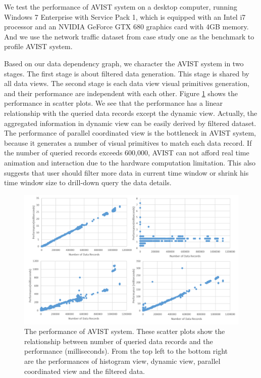 \documentclass[journal]{vgtc}                %
\begin{document}
{We test the performance of AVIST system on a desktop computer, running Windows 7 Enterprise with Service Pack 1, which is equipped with an Intel i7 processor and an NVIDIA GeForce GTX 680 graphics card with 4GB memory. And we use the network traffic dataset from case study one as the benchmark to profile AVIST system.  



Based on our data dependency graph, we character the AVIST system in two stages. The first stage is about filtered data generation. This stage is shared by all data views. The second stage is each data view visual primitives generation, and their performance are independent with each other. Figure \ref{fig:performance} shows the performance in scatter plots. We see that the performance has a linear relationship with the queried data records except the dynamic view. Actually, the aggregated information in dynamic view can be easily derived by filtered dataset. The performance of parallel coordinated view is the bottleneck in AVIST system, because it generates a number of visual primitives to match each data record. If the number of queried records exceeds 600,000, AVIST can not afford real time animation and interaction due to the hardware computation limitation. This also suggests that user should filter more data in current time window or shrink his time window size to drill-down query the data details.

\begin{figure}[htb]
	\centering
	\includegraphics[width=1.0\linewidth]{pic/performance.png}
	\parbox[t]{1.0\columnwidth}{\relax
	}
	\caption{\label{fig:performance}
		The performance of AVIST system. These scatter plots show the relationship between number of queried data records and the performance (milliseconds). From the top left to the bottom right are the performances of histogram view, dynamic view, parallel coordinated view and the filtered data.  }
\end{figure}

}
\end{document}
